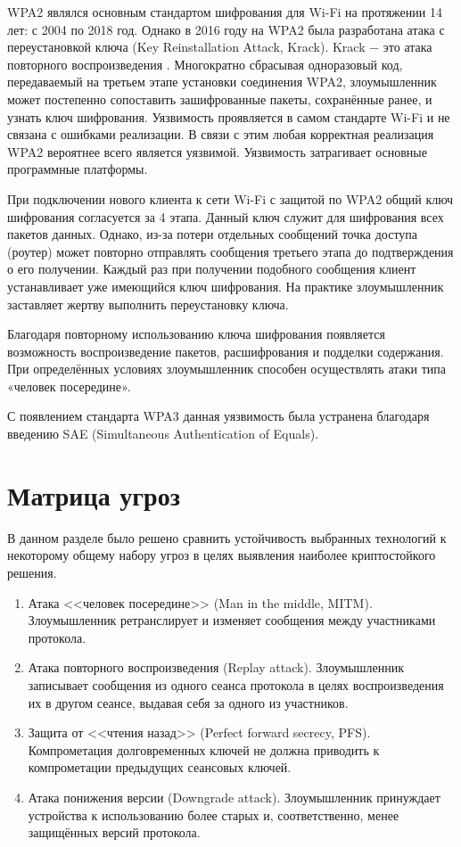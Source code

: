 	WPA2 являлся основным стандартом шифрования для Wi-Fi на протяжении 14 лет: с 2004 по 2018 год.
	Однако в 2016 году на WPA2 была разработана атака с переустановкой ключа (Key Reinstallation Attack, Krack).
	Krack $-$ это атака повторного воспроизведения \cite{cve-2017-13077}. Многократно сбрасывая одноразовый код, передаваемый 
	на третьем этапе установки соединения WPA2, злоумышленник может постепенно сопоставить зашифрованные 
	пакеты, сохранённые ранее, и узнать ключ шифрования.
	Уязвимость проявляется в самом стандарте Wi-Fi и не связана с ошибками реализации. В связи с этим любая
	корректная реализация WPA2 вероятнее всего является уязвимой. Уязвимость затрагивает основные 
	программные платформы.
	
	При подключении нового клиента к сети Wi-Fi с защитой по WPA2 общий ключ шифрования согласуется 
	за 4 этапа. Данный ключ служит для шифрования всех пакетов данных. Однако, из-за потери отдельных 
	сообщений точка доступа (роутер) может повторно отправлять сообщения третьего этапа до 
	подтверждения о его получении. Каждый раз при получении подобного сообщения клиент устанавливает 
	уже имеющийся ключ шифрования. На практике злоумышленник заставляет жертву выполнить переустановку
	ключа.
	
	Благодаря повторному использованию ключа шифрования появляется возможность воспроизведение пакетов, 
	расшифрования и подделки содержания. При определённых условиях злоумышленник способен осуществлять 
	атаки типа «человек посередине».
	
	С появлением стандарта WPA3 данная уязвимость была устранена благодаря введению SAE (Simultaneous 
	Authentication of Equals).
	
	
	\section{Матрица угроз}
	
	В данном разделе было решено сравнить устойчивость выбранных технологий к некоторому общему набору
	угроз в целях выявления наиболее криптостойкого решения.
	
	\begin{enumerate}
		\item Атака <<человек посередине>> (Man in the middle, MITM). Злоумышленник ретранслирует и 
		изменяет сообщения между участниками протокола.
		\item Атака повторного воспроизведения (Replay attack). Злоумышленник записывает сообщения
		из одного сеанса протокола в целях воспроизведения их в другом сеансе, выдавая себя за одного
		из участников.
		\item Защита от <<чтения назад>> (Perfect forward secrecy, PFS). Компрометация долговременных ключей 
		не должна приводить к компрометации предыдущих сеансовых ключей.
		\item Атака понижения версии (Downgrade attack). Злоумышленник принуждает устройства к
		использованию более старых и, соответственно, менее защищённых версий протокола.
	\end{enumerate}

